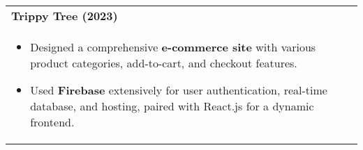 \documentclass[a4paper,8pt]{article}
\begin{document}
\vspace{-2pt}

\begin{tabularx}{\linewidth}{ @{}l r@{} }
\textbf{Trippy Tree (2023)} \hfill \color[HTML]{371e77} \\[1pt]
\begin{minipage}[t]{\linewidth}
    \begin{itemize}[nosep,after=\strut, leftmargin=2em, itemsep=2pt]
        \item Designed a comprehensive \textbf{e-commerce site} with various product categories, add-to-cart, and checkout features.
        \item Used \textbf{Firebase} extensively for user authentication, real-time database, and hosting, paired with React.js for a dynamic frontend.
    \end{itemize}
\end{minipage}
\end{tabularx}
\end{document}
